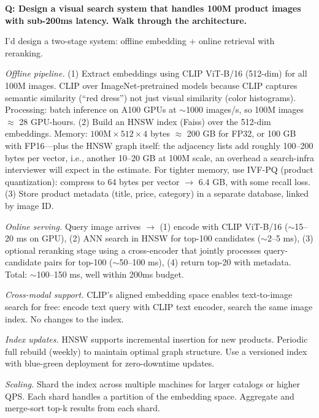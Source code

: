 \begin{interviewq}
\textbf{Q: Design a visual search system that handles 100M product images with sub-200ms latency. Walk through the architecture.}

 \quad {} \quad \badgefreq{\freqmed}

\stronganswer I'd design a two-stage system: offline embedding + online retrieval with reranking.

\textit{Offline pipeline.} (1) Extract embeddings using CLIP ViT-B/16 (512-dim) for all 100M images. CLIP over ImageNet-pretrained models because CLIP captures semantic similarity (``red dress'') not just visual similarity (color histograms). Processing: batch inference on A100 GPUs at $\sim$1000 images/s, so 100M images $\approx$ 28 GPU-hours. (2) Build an HNSW index (Faiss) over the 512-dim embeddings. Memory: $100\text{M} \times 512 \times 4$ bytes $\approx$ 200 GB for FP32, or 100 GB with FP16---plus the HNSW graph itself: the adjacency lists add roughly 100--200 bytes per vector, i.e., another 10--20 GB at 100M scale, an overhead a search-infra interviewer will expect in the estimate. For tighter memory, use IVF-PQ (product quantization): compress to 64 bytes per vector $\to$ 6.4 GB, with some recall loss. (3) Store product metadata (title, price, category) in a separate database, linked by image ID.

\textit{Online serving.} Query image arrives $\to$ (1) encode with CLIP ViT-B/16 ($\sim$15--20 ms on GPU), (2) ANN search in HNSW for top-100 candidates ($\sim$2--5 ms), (3) optional reranking stage using a cross-encoder that jointly processes query-candidate pairs for top-100 ($\sim$50--100 ms), (4) return top-20 with metadata. Total: $\sim$100--150 ms, well within 200ms budget.

\textit{Cross-modal support.} CLIP's aligned embedding space enables text-to-image search for free: encode text query with CLIP text encoder, search the same image index. No changes to the index.

\textit{Index updates.} HNSW supports incremental insertion for new products. Periodic full rebuild (weekly) to maintain optimal graph structure. Use a versioned index with blue-green deployment for zero-downtime updates.

\textit{Scaling.} Shard the index across multiple machines for larger catalogs or higher QPS. Each shard handles a partition of the embedding space. Aggregate and merge-sort top-k results from each shard.


\end{interviewq}
